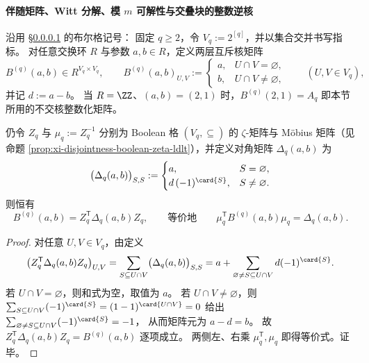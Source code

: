 \paragraph{伴随矩阵、Witt 分解、模 \texorpdfstring{$m$}{m} 可解性与交叠块的整数逆核}\label{subsubsec:xi-time-protocol-conclusions-part30a-boolean-kernel-rigidity}
沿用 \S\ref{subsubsec:xi-time-protocol-conclusions-part30a-boolean-kernel-rigidity} 的布尔格记号：
固定 \(q\ge 2\)，令 \(V_q:=2^{[q]}\)，并以集合交并书写指标。
对任意交换环 \(R\) 与参数 \(a,b\in R\)，定义两层互斥核矩阵
\[
B^{(q)}(a,b)\in R^{V_q\times V_q},
\qquad
B^{(q)}(a,b)_{U,V}:=
\begin{cases}
a,&U\cap V=\varnothing,\\
b,&U\cap V\neq \varnothing,
\end{cases}
\qquad(U,V\in V_q),
\]
并记 \(d:=a-b\)。
当 \(R=\ZZ\)、\((a,b)=(2,1)\) 时，\(B^{(q)}(2,1)=A_q\) 即本节所用的不交核整数化矩阵。

\begin{theorem}\label{thm:xi-boolean-two-layer-zeta-mu-diagonalization}
仍令 \(Z_q\) 与 \(\mu_q:=Z_q^{-1}\) 分别为 Boolean 格 \((V_q,\subseteq)\) 的 \(\zeta\)-矩阵与 Möbius 矩阵（见命题 \ref{prop:xi-disjointness-boolean-zeta-ldlt}），并定义对角矩阵 \(\Delta_q(a,b)\) 为
\[
\bigl(\Delta_q(a,b)\bigr)_{S,S}:=
\begin{cases}
a,&S=\varnothing,\\
d\,(-1)^{\card{S}},&S\neq \varnothing.
\end{cases}
\]
则恒有
\[
B^{(q)}(a,b)=Z_q^{\mathsf T}\Delta_q(a,b)Z_q,
\qquad\text{等价地}\qquad
\mu_q^{\mathsf T}B^{(q)}(a,b)\mu_q=\Delta_q(a,b).
\]
\end{theorem}
\begin{proof}
对任意 \(U,V\in V_q\)，由定义
\[
\bigl(Z_q^{\mathsf T}\Delta_q(a,b)Z_q\bigr)_{U,V}
=\sum_{S\subseteq U\cap V}\bigl(\Delta_q(a,b)\bigr)_{S,S}
=a+\sum_{\varnothing\neq S\subseteq U\cap V}d(-1)^{\card{S}}.
\]
若 \(U\cap V=\varnothing\)，则和式为空，取值为 \(a\)。
若 \(U\cap V\neq\varnothing\)，则
\(
\sum_{S\subseteq U\cap V}(-1)^{\card{S}}=(1-1)^{\card{U\cap V}}=0
\)
给出
\(
\sum_{\varnothing\neq S\subseteq U\cap V}(-1)^{\card{S}}=-1
\)，
从而矩阵元为 \(a-d=b\)。
故 \(Z_q^{\mathsf T}\Delta_q(a,b)Z_q=B^{(q)}(a,b)\) 逐项成立。
两侧左、右乘 \(\mu_q^{\mathsf T},\mu_q\) 即得等价式。证毕。
\end{proof}

